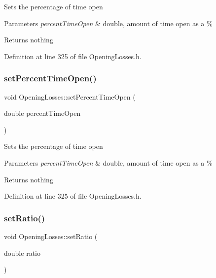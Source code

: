 Sets the percentage of time open


\begin{DoxyParams}{Parameters}
{\em percent\+Time\+Open} & double, amount of time open as a \%\\
\hline
\end{DoxyParams}
\begin{DoxyReturn}{Returns}
nothing 
\end{DoxyReturn}


Definition at line 325 of file Opening\+Losses.\+h.

\mbox{\label{class_opening_losses_a889b6aa25bf6d8fc8fb284ec0c2a1625}} 
\subsubsection{\texorpdfstring{set\+Percent\+Time\+Open()}{setPercentTimeOpen()}\hspace{0.1cm}{\footnotesize\ttfamily [3/3]}}
{\footnotesize\ttfamily void Opening\+Losses\+::set\+Percent\+Time\+Open (\begin{DoxyParamCaption}\item[{double}]{percent\+Time\+Open }\end{DoxyParamCaption})\hspace{0.3cm}{\ttfamily [inline]}}

Sets the percentage of time open


\begin{DoxyParams}{Parameters}
{\em percent\+Time\+Open} & double, amount of time open as a \%\\
\hline
\end{DoxyParams}
\begin{DoxyReturn}{Returns}
nothing 
\end{DoxyReturn}


Definition at line 325 of file Opening\+Losses.\+h.

\mbox{\label{class_opening_losses_aab7f82f24511c37f0bc4b29cbc7239b5}} 
\subsubsection{\texorpdfstring{set\+Ratio()}{setRatio()}\hspace{0.1cm}{\footnotesize\ttfamily [1/3]}}
{\footnotesize\ttfamily void Opening\+Losses\+::set\+Ratio (\begin{DoxyParamCaption}\item[{double}]{ratio }\end{DoxyParamCaption})\hspace{0.3cm}{\ttfamily [inline]}}

